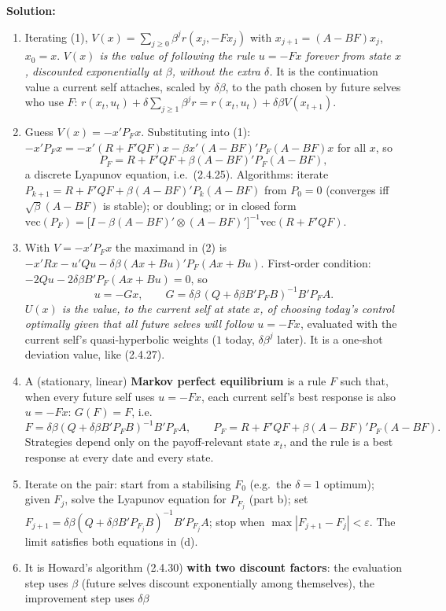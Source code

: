 \documentclass[12pt, letterpaper]{article}
\begin{document}
\begin{tcolorbox}[evenbox,title={Exercise 2.30 \quad Phelps and Pollak (1968) Meet Howard}]
\textbf{Solution:}

\begin{enumerate}
\item Iterating (1), $V(x)=\sum_{j\ge0}\beta^jr(x_j,-Fx_j)$ with $x_{j+1}=(A-BF)x_j$, $x_0=x$.
\emph{$V(x)$ is the value of following the rule $u=-Fx$ forever from state $x$, discounted
exponentially at $\beta$, without the extra $\delta$.} It is the continuation value a current self
attaches, scaled by $\delta\beta$, to the path chosen by future selves who use $F$:
$r(x_t,u_t)+\delta\sum_{j\ge1}\beta^jr=r(x_t,u_t)+\delta\beta V(x_{t+1})$.
\item Guess $V(x)=-x'P_Fx$. Substituting into (1):
$-x'P_Fx=-x'(R+F'QF)x-\beta x'(A-BF)'P_F(A-BF)x$ for all $x$, so
\[
\boxed{P_F=R+F'QF+\beta(A-BF)'P_F(A-BF)},
\]
a discrete Lyapunov equation, i.e.\ (2.4.25). Algorithms: iterate $P_{k+1}=R+F'QF+\beta(A-BF)'P_k(A-BF)$
from $P_0=0$ (converges iff $\sqrt\beta(A-BF)$ is stable); or doubling; or in closed form
$\text{vec}(P_F)=\big[I-\beta(A-BF)'\otimes(A-BF)'\big]^{-1}\text{vec}(R+F'QF)$.
\item With $V=-x'P_Fx$ the maximand in (2) is $-x'Rx-u'Qu-\delta\beta(Ax+Bu)'P_F(Ax+Bu)$. First-order
condition: $-2Qu-2\delta\beta B'P_F(Ax+Bu)=0$, so
\[
u=-Gx,\qquad \boxed{G=\delta\beta\,(Q+\delta\beta B'P_FB)^{-1}B'P_FA}.
\]
\emph{$U(x)$ is the value, to the current self at state $x$, of choosing today's control optimally given
that all future selves will follow $u=-Fx$}, evaluated with the current self's quasi-hyperbolic
weights ($1$ today, $\delta\beta^j$ later). It is a one-shot deviation value, like (2.4.27).
\item A (stationary, linear) \textbf{Markov perfect equilibrium} is a rule $F$ such that, when every
future self uses $u=-Fx$, each current self's best response is also $u=-Fx$: $G(F)=F$, i.e.
\[
F=\delta\beta(Q+\delta\beta B'P_FB)^{-1}B'P_FA,\qquad P_F=R+F'QF+\beta(A-BF)'P_F(A-BF).
\]
Strategies depend only on the payoff-relevant state $x_t$, and the rule is a best response at every
date and every state.
\item Iterate on the pair: start from a stabilising $F_0$ (e.g.\ the $\delta=1$ optimum); given $F_j$,
solve the Lyapunov equation for $P_{F_j}$ (part b); set $F_{j+1}=\delta\beta(Q+\delta\beta B'P_{F_j}B)^{-1}B'P_{F_j}A$;
stop when $\max|F_{j+1}-F_j|<\varepsilon$. The limit satisfies both equations in (d).
\item It is Howard's algorithm (2.4.30) \textbf{with two discount factors}: the evaluation step uses
$\beta$ (future selves discount exponentially among themselves), the improvement step uses $\delta\beta$

\end{enumerate}
\end{tcolorbox}
\end{document}
